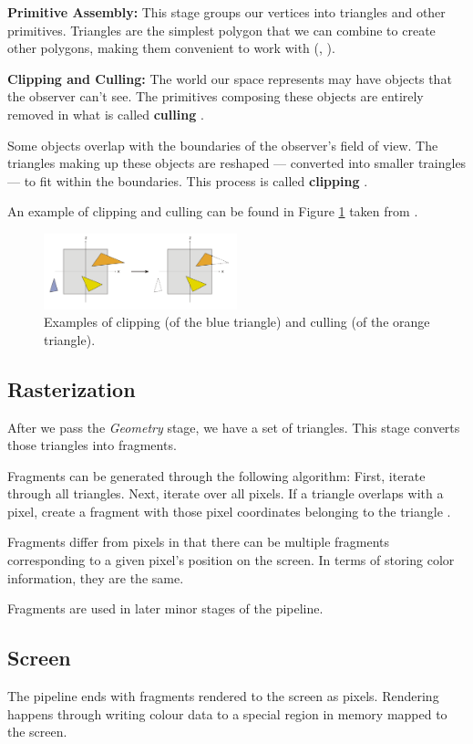 \textbf{Primitive Assembly:}
This stage groups our vertices into triangles and other primitives.
Triangles are the simplest polygon that we can combine to create other polygons,
making them convenient to work with (\cite{wiki:overview}, \cite{scratchapixelRasterization}).

\textbf{Clipping and Culling:}
The world our space represents may have objects that the observer can't see.
The primitives composing these objects are entirely removed in what is called \textbf{culling} \cite{graphicscompendiumGraphicsCompendium}.

Some objects overlap with the boundaries of the observer's field of view. The
triangles making up these objects are reshaped --- converted into smaller traingles ---
to fit within the boundaries.
This process is called \textbf{clipping} \cite{graphicscompendiumGraphicsCompendium}.

An example of clipping and culling can be found in Figure \ref{fig:clip} taken from \cite{wiki:Graphics_pipeline}.

\begin{figure}[h]
    \centering
    \includegraphics[width=0.5\textwidth]{assets/Cube_clipping.png}
    \caption{Examples of clipping (of the blue triangle) and culling (of the orange triangle). }
    \label{fig:clip}
\end{figure}

\subsection{Rasterization}

After we pass the \textit{Geometry} stage, we have a set of triangles.
This stage converts those triangles into fragments.

Fragments can be generated through the following algorithm:
First, iterate through all triangles. Next, iterate over all pixels.
If a triangle overlaps with a pixel, create a fragment with those pixel
coordinates belonging to the triangle \cite{scratchapixelRasterization}.

Fragments differ from pixels in that there can be multiple fragments corresponding
to a given pixel's position on the screen. In terms of storing color information,
they are the same.

Fragments are used in later minor stages of the pipeline.

\subsection{Screen}
The pipeline ends with fragments rendered to the screen as pixels.
Rendering happens through writing colour data to a special region in memory
mapped to the screen.
